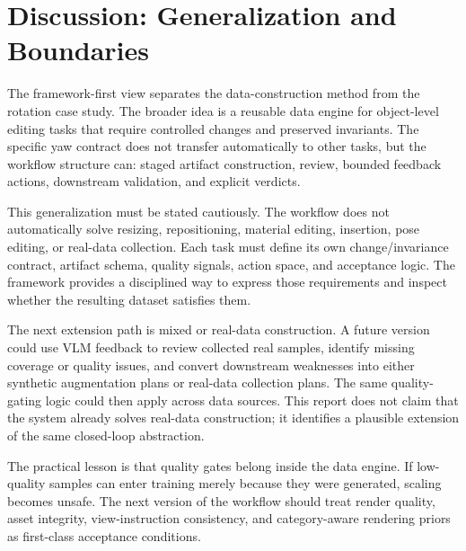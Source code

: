 \section{Discussion: Generalization and Boundaries}
\label{sec:discussion}

The framework-first view separates the data-construction method from the rotation case study. The broader idea is a reusable data engine for object-level editing tasks that require controlled changes and preserved invariants. The specific yaw contract does not transfer automatically to other tasks, but the workflow structure can: staged artifact construction, review, bounded feedback actions, downstream validation, and explicit verdicts.

This generalization must be stated cautiously. The workflow does not automatically solve resizing, repositioning, material editing, insertion, pose editing, or real-data collection. Each task must define its own change/invariance contract, artifact schema, quality signals, action space, and acceptance logic. The framework provides a disciplined way to express those requirements and inspect whether the resulting dataset satisfies them.

The next extension path is mixed or real-data construction. A future version could use VLM feedback to review collected real samples, identify missing coverage or quality issues, and convert downstream weaknesses into either synthetic augmentation plans or real-data collection plans. The same quality-gating logic could then apply across data sources. This report does not claim that the system already solves real-data construction; it identifies a plausible extension of the same closed-loop abstraction.

The practical lesson is that quality gates belong inside the data engine. If low-quality samples can enter training merely because they were generated, scaling becomes unsafe. The next version of the workflow should treat render quality, asset integrity, view-instruction consistency, and category-aware rendering priors as first-class acceptance conditions.
